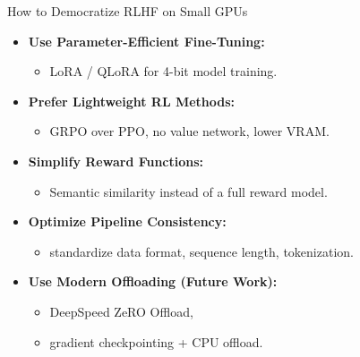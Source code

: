 \documentclass[10pt]{beamer}
\begin{document}
\begin{frame}{How to Democratize RLHF on Small GPUs}
\large

\begin{itemize}
    \item<1-> \textbf{Use Parameter-Efficient Fine-Tuning:}
    \begin{itemize}
        \item LoRA / QLoRA for 4-bit model training.
    \end{itemize}

    \vspace{0.25cm}

    \item<1-> \textbf{Prefer Lightweight RL Methods:}
    \begin{itemize}
        \item GRPO over PPO, no value network, lower VRAM.
    \end{itemize}

    \vspace{0.25cm}

    \item<1-> \textbf{Simplify Reward Functions:}
    \begin{itemize}
        \item Semantic similarity instead of a full reward model.
    \end{itemize}

    \vspace{0.25cm}

    \item<2-> \textbf{Optimize Pipeline Consistency:}
    \begin{itemize}
        \item standardize data format, sequence length, tokenization.
    \end{itemize}

    \vspace{0.25cm}

    \item<2-> \textbf{Use Modern Offloading (Future Work):}
    \begin{itemize}
        \item DeepSpeed ZeRO Offload,
        \item gradient checkpointing + CPU offload.
    \end{itemize}
\end{itemize}

\end{frame}
\end{document}
